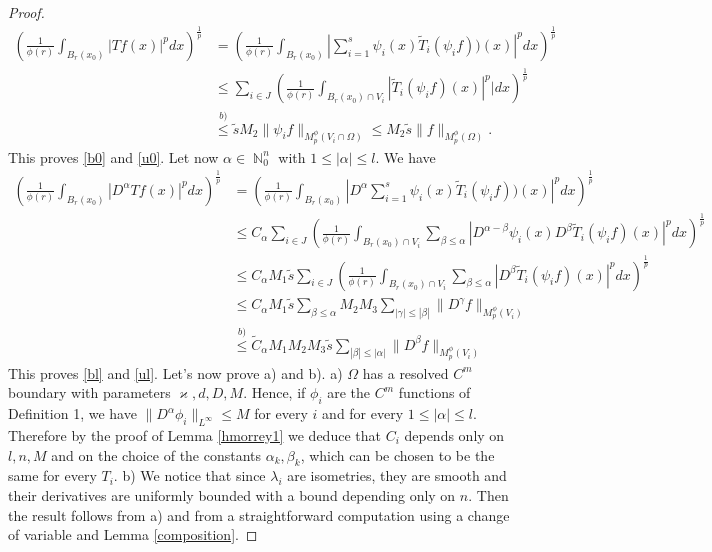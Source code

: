 \documentclass[12pt]{article}
\theoremstyle{definition}
\DeclareMathOperator\nn{\mathbb{N}}
\begin{document}
\begin{proof}
\begin{align*}
\left( \frac{1}{\phi(r)} \int_{B_r(x_0)} |Tf(x)|^pdx  \right)^{\frac{1}{p}} &=  \left( \frac{1}{\phi(r)} \int_{B_r(x_0)} |\sum_{i=1}^s \psi_i(x) \widetilde T_i(\psi_if))(x) |^pdx \right)^{\frac{1}{p}}\\
&\le \sum_{i \in J} \left( \frac{1}{\phi(r)} \int_{{B_r(x_0)} \cap V_i} | \widetilde T_i(\psi_if)(x)|^p |dx \right)^{\frac{1}{p}}\\
&\overset{b)}\le \widetilde s M_2\| \psi_i f\|_{M_p^\phi(V_i \cap \Omega)} \le M_2\widetilde s \| f\|_{M_p^\phi(\Omega)}.
\end{align*}
This proves \eqref{b0} and \eqref{u0}. Let now $\alpha \in \nn_0^n$ with $1\le|\alpha|\le l.$ We have 
\begin{align*}
\left( \frac{1}{\phi(r)} \int_{B_r(x_0)} |D^\alpha Tf(x)|^pdx  \right)^{\frac{1}{p}} &=  \left( \frac{1}{\phi(r)} \int_{B_r(x_0)} |D^\alpha \sum_{i=1}^s \psi_i(x) \widetilde T_i(\psi_if))(x) |^pdx \right)^{\frac{1}{p}}\\
&\le C_\alpha \sum_{i \in J} \left( \frac{1}{\phi(r)} \int_{{B_r(x_0)} \cap V_i} \sum_{\beta \le \alpha}|D^{\alpha -\beta}\psi_i(x) D^\beta \widetilde T_i(\psi_if)(x)|^p dx \right)^{\frac{1}{p}}\\
&\le C_\alpha M_1 \widetilde s \sum_{i \in J} \left( \frac{1}{\phi(r)} \int_{{B_r(x_0)} \cap V_i} \sum_{\beta \le \alpha}|D^\beta \widetilde T_i(\psi_if)(x)|^p dx \right)^{\frac{1}{p}}\\
&\le C_\alpha M_1\widetilde s \sum_{\beta \le \alpha } M_2M_3 \sum_{|\gamma|\le |\beta|} \| D^\gamma f\|_{M_p^\phi(V_i)} \\
&  \overset{b)}\le \widetilde C_\alpha M_1M_2M_3\widetilde s \sum_{|\beta| \le |\alpha|}\| D^\beta f\|_{M_p^\phi(V_i)} 
\end{align*}
This proves \eqref{bl} and \eqref{ul}. Let's now prove a) and b). a) $\Omega$ has a resolved $C^m$ boundary with parameters $\varkappa,d,D,M$. Hence, if $\phi_i$ are the $C^m$ functions of Definition 1, we have $\| D^{\alpha}\phi_i \|_{L^\infty}\le M$ for every $i$ and for every $1\le|\alpha|\le l$. Therefore by the proof of Lemma \ref{hmorrey1} we deduce that $C_i$ depends only on $l,n,M$ and on the choice of the constants $\alpha_k,\beta_k$, which can be chosen to be the same for every $T_i$.
b) We notice that since $\lambda_i$ are isometries, they are smooth and their derivatives are uniformly bounded with a bound depending only on $n$. Then the result follows from a) and from a straightforward computation using a change of variable and Lemma \ref{composition}.
\end{proof}
	
\end{document}
